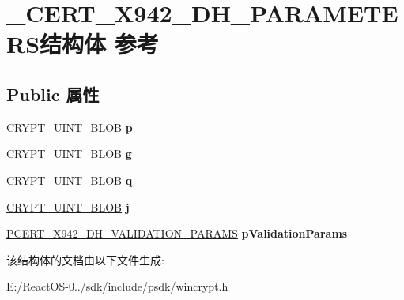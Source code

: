 \hypertarget{struct___c_e_r_t___x942___d_h___p_a_r_a_m_e_t_e_r_s}{}\section{\+\_\+\+C\+E\+R\+T\+\_\+\+X942\+\_\+\+D\+H\+\_\+\+P\+A\+R\+A\+M\+E\+T\+E\+R\+S结构体 参考}
\label{struct___c_e_r_t___x942___d_h___p_a_r_a_m_e_t_e_r_s}
\subsection*{Public 属性}
\begin{DoxyCompactItemize}
\item 
\mbox{\label{struct___c_e_r_t___x942___d_h___p_a_r_a_m_e_t_e_r_s_ac6754d9afa0558eac8e4146e1cbe08d4}} 
\hyperlink{struct___c_r_y_p_t_o_a_p_i___b_l_o_b}{C\+R\+Y\+P\+T\+\_\+\+U\+I\+N\+T\+\_\+\+B\+L\+OB} {\bfseries p}
\item 
\mbox{\label{struct___c_e_r_t___x942___d_h___p_a_r_a_m_e_t_e_r_s_a82fa7f3723e74d0d89c8b4af16a761c4}} 
\hyperlink{struct___c_r_y_p_t_o_a_p_i___b_l_o_b}{C\+R\+Y\+P\+T\+\_\+\+U\+I\+N\+T\+\_\+\+B\+L\+OB} {\bfseries g}
\item 
\mbox{\label{struct___c_e_r_t___x942___d_h___p_a_r_a_m_e_t_e_r_s_a951ec80efe50c0f624d964d1900197be}} 
\hyperlink{struct___c_r_y_p_t_o_a_p_i___b_l_o_b}{C\+R\+Y\+P\+T\+\_\+\+U\+I\+N\+T\+\_\+\+B\+L\+OB} {\bfseries q}
\item 
\mbox{\label{struct___c_e_r_t___x942___d_h___p_a_r_a_m_e_t_e_r_s_a3b687f1fe1cbb62cecc9c1374955f30a}} 
\hyperlink{struct___c_r_y_p_t_o_a_p_i___b_l_o_b}{C\+R\+Y\+P\+T\+\_\+\+U\+I\+N\+T\+\_\+\+B\+L\+OB} {\bfseries j}
\item 
\mbox{\label{struct___c_e_r_t___x942___d_h___p_a_r_a_m_e_t_e_r_s_a5022eba023862054e92c3a8af27172a6}} 
\hyperlink{struct___c_e_r_t___x942___d_h___v_a_l_i_d_a_t_i_o_n___p_a_r_a_m_s}{P\+C\+E\+R\+T\+\_\+\+X942\+\_\+\+D\+H\+\_\+\+V\+A\+L\+I\+D\+A\+T\+I\+O\+N\+\_\+\+P\+A\+R\+A\+MS} {\bfseries p\+Validation\+Params}
\end{DoxyCompactItemize}


该结构体的文档由以下文件生成\+:\begin{DoxyCompactItemize}
\item 
E\+:/\+React\+O\+S-\/0../sdk/include/psdk/wincrypt.\+h\end{DoxyCompactItemize}
